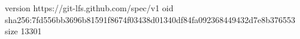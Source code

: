 version https://git-lfs.github.com/spec/v1
oid sha256:7fd556bb3696b81591f8674f03438d01340df84fa092368449432d7e8b376553
size 13301
